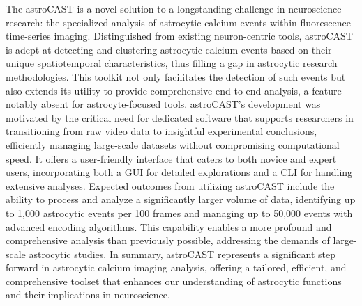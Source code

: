 The \ac{astroCAST} is a novel solution to a longstanding challenge in neuroscience research: the specialized analysis of astrocytic calcium events within fluorescence time-series imaging. Distinguished from existing neuron-centric tools, \ac{astroCAST} is adept at detecting and clustering astrocytic calcium events based on their unique spatiotemporal characteristics, thus filling a gap in astrocytic research methodologies. This toolkit not only facilitates the detection of such events but also extends its utility to provide comprehensive end-to-end analysis, a feature notably absent for astrocyte-focused tools. \ac{astroCAST}'s development was motivated by the critical need for dedicated software that supports researchers in transitioning from raw video data to insightful experimental conclusions, efficiently managing large-scale datasets without compromising computational speed. It offers a user-friendly interface that caters to both novice and expert users, incorporating both a \ac{GUI} for detailed explorations and a \ac{CLI} for handling extensive analyses. Expected outcomes from utilizing \ac{astroCAST} include the ability to process and analyze a significantly larger volume of data, identifying up to 1,000 astrocytic events per 100 frames and managing up to 50,000 events with advanced encoding algorithms. This capability enables a more profound and comprehensive analysis than previously possible, addressing the demands of large-scale astrocytic studies. In summary, \ac{astroCAST} represents a significant step forward in astrocytic calcium imaging analysis, offering a tailored, efficient, and comprehensive toolset that enhances our understanding of astrocytic functions and their implications in neuroscience.